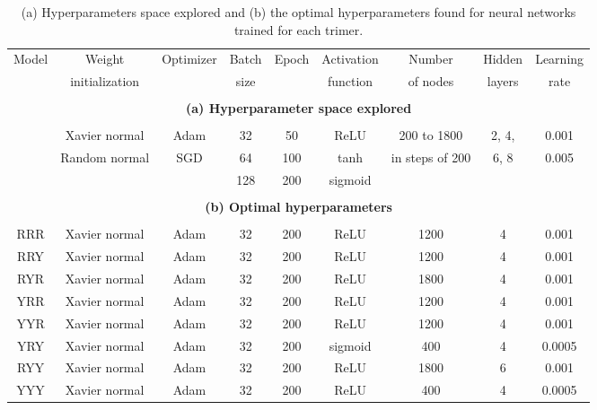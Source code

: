 \begin{table}
\begin{center}
\begin{small}
\begin{tabular}{c c c c c c c c c }
\hline
Model & Weight  & Optimizer  & Batch  & Epoch & Activation  & Number   &  Hidden & Learning  \\
& initialization & &  size &  &  function & of nodes  &  layers & rate \\
 \hline
 \hline 
\vspace{-0.2cm}
\multicolumn{9}{c}{} \\ 
\multicolumn{9}{c}{\textbf{(a) Hyperparameter space explored}} \\ 
\vspace{-0.2cm}
\multicolumn{9}{c}{} \\  
& Xavier normal  & Adam    & 32   & 50  & ReLU    & 200 to 1800 &  2, 4,  & 0.001   \\
& Random normal  & SGD     & 64  & 100 & tanh    & in steps of 200 & 6, 8  & 0.005   \\
&  &  & 128 & 200 & sigmoid & &  & \\
\hline
\hline
\vspace{-0.2cm}
\multicolumn{9}{c}{} \\  
\multicolumn{9}{c}{\textbf{(b) Optimal hyperparameters}} \\
\vspace{-0.2cm}
\multicolumn{9}{c}{} \\ 
RRR & Xavier normal  & Adam    & 32   & 200  & ReLU    & 1200 &  4  & 0.001 \\
RRY & Xavier normal  & Adam    & 32   & 200  & ReLU    & 1200 &  4  & 0.001 \\
RYR & Xavier normal  & Adam    & 32   & 200  & ReLU    & 1800 &  4  & 0.001 \\
YRR & Xavier normal  & Adam    & 32   & 200  & ReLU    & 1200 &  4  & 0.001 \\
YYR & Xavier normal  & Adam    & 32   & 200  & ReLU    & 1200 &  4  & 0.001 \\
YRY & Xavier normal  & Adam & 32   & 200  & sigmoid    & 400 &  4  & 0.0005 \\
RYY & Xavier normal  & Adam    & 32   & 200  & ReLU    & 1800 &  6  & 0.001 \\
YYY & Xavier normal  & Adam    & 32   & 200  & ReLU    & 400 &  4 & 0.0005 \\
\end{tabular}
\end{small}
\end{center}
\caption{(a) Hyperparameters space explored and (b) the optimal hyperparameters found for neural networks trained for each trimer.}
\label{c7:tab_hyper}
\end{table}

